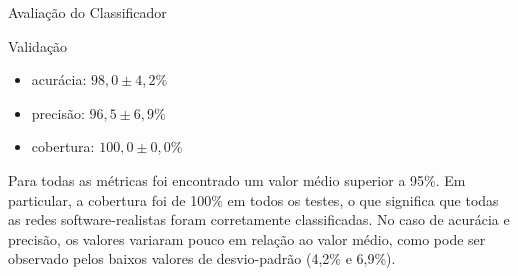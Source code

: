 \begin{section}{Avaliação do Classificador}
\begin{subsection}{Validação}
		\begin{itemize}
			\item acurácia:  $98,0 \pm 4,2\%$
			\item precisão:  $96,5 \pm 6,9\%$
			\item cobertura: $100,0 \pm 0,0\%$
		\end{itemize}

		Para todas as métricas foi encontrado um valor médio superior a 95\%. Em particular, a cobertura foi de 100\% em todos os testes, o que significa que todas as redes software-realistas foram corretamente classificadas. No caso de acurácia e precisão, os valores variaram pouco em relação ao valor médio, como pode ser observado pelos baixos valores de desvio-padrão (4,2\% e 6,9\%).

		

\end{subsection}	
\end{section}

